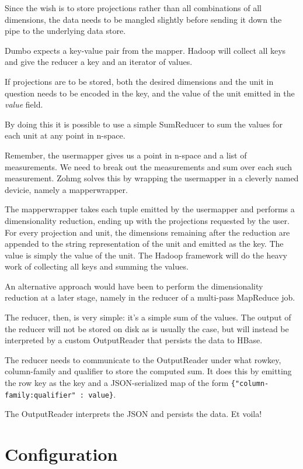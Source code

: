\documentclass[a4paper,10pt]{book}
\begin{document}
Since the wish is to store projections rather than all combinations of all
dimensions, the data needs to be mangled slightly before sending it down
the pipe to the underlying data store.

Dumbo expects a key-value pair from the mapper. Hadoop will collect all keys
and give the reducer a key and an iterator of values.

If projections are to be stored, both the desired dimensions and the unit
in question needs to be encoded in the key, and the value of the unit
emitted in the \textit{value} field.

By doing this it is possible to use a simple SumReducer to sum the values
for each unit at any point in n-space.

Remember, the usermapper gives us a point in n-space and a list of
measurements. We need to break out the measurements and sum over each such
measurement. Zohmg solves this by wrapping the usermapper in a cleverly named
devicie, namely a mapperwrapper.

The mapperwrapper takes each tuple emitted by the usermapper and performs a
dimensionality reduction, ending up with the projections requested by the
user. For every projection and unit, the dimensions remaining after the
reduction are appended to the string representation of the unit and emitted
as the key. The value is simply the value of the unit. The Hadoop framework
will do the heavy work of collecting all keys and summing the values.

An alternative approach would have been to perform the dimensionality
reduction at a later stage, namely in the reducer of a multi-pass MapReduce
job.

The reducer, then, is very simple: it's a simple sum of the values. The output
of the reducer will not be stored on disk as is usually the case, but will
instead be interpreted by a custom OutputReader that persists the data to
HBase.

The reducer needs to communicate to the OutputReader under what rowkey,
column-family and qualifier to store the computed sum. It does this by
emitting the row key as the key and a JSON-serialized map of the form
\texttt{\{"column-family:qualifier" : value\}}.

The OutputReader interprets the JSON and persists the data. Et voila!


\section{Configuration}
\end{document}
